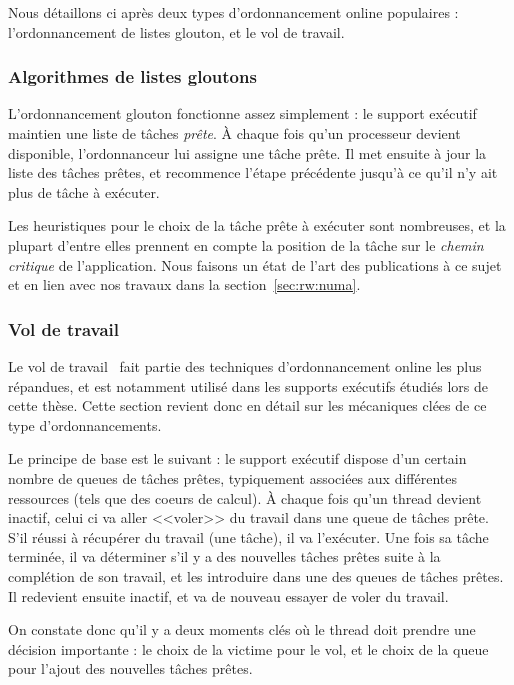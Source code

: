 Nous détaillons ci après deux types d'ordonnancement online populaires : l'ordonnancement de listes glouton, et le vol de travail.

\subsubsection{Algorithmes de listes gloutons}

L'ordonnancement glouton fonctionne assez simplement : le support exécutif maintien une liste de tâches \emph{prête}.
À chaque fois qu'un processeur devient disponible, l'ordonnanceur lui assigne une tâche prête.
Il met ensuite à jour la liste des tâches prêtes, et recommence l'étape précédente jusqu'à ce qu'il n'y ait plus de tâche à exécuter.

Les heuristiques pour le choix de la tâche prête à exécuter sont nombreuses, et la plupart d'entre elles prennent en compte la position de la tâche sur le \emph{chemin critique} de l'application.
Nous faisons un état de l'art des publications à ce sujet et en lien avec nos travaux dans la section~\ref{sec:rw:numa}.

\subsubsection{Vol de travail}\label{sec:context:runtimes:ws}

Le vol de travail~\cite{Blumofe1999} fait partie des techniques d'ordonnancement online les plus répandues, et est notamment utilisé dans les supports exécutifs étudiés lors de cette thèse.
Cette section revient donc en détail sur les mécaniques clées de ce type d'ordonnancements.

Le principe de base est le suivant : le support exécutif dispose d'un certain nombre de queues de tâches prêtes, typiquement associées aux différentes ressources (tels que des coeurs de calcul).
À chaque fois qu'un thread devient inactif, celui ci va aller <<voler>> du travail dans une queue de tâches prête.
S'il réussi à récupérer du travail (une tâche), il va l'exécuter.
Une fois sa tâche terminée, il va déterminer s'il y a des nouvelles tâches prêtes suite à la complétion de son travail, et les introduire dans une des queues de tâches prêtes.
Il redevient ensuite inactif, et va de nouveau essayer de voler du travail.

On constate donc qu'il y a deux moments clés où le thread doit prendre une décision importante : le choix de la victime pour le vol, et le choix de la queue pour l'ajout des nouvelles tâches prêtes.

